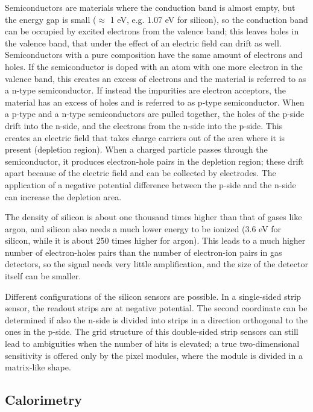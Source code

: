 Semiconductors are materials where the conduction band is almost empty, but the energy gap is small ($\approx$ 1 eV, e.g. 1.07 eV for silicon), so the conduction band can be occupied by excited electrons from the valence band; this leaves holes in the valence band, that under the effect of an electric field can drift as well. Semiconductors with a pure composition have the same amount of electrons and holes. If the semiconductor is doped with an atom with one more electron in the valence band, this creates an excess of electrons and the material is referred to as a n-type semiconductor. If instead the impurities are electron acceptors, the material has an excess of holes and is referred to as p-type semiconductor. When a p-type and a n-type semiconductors are pulled together, the holes of the p-side drift into the n-side, and the electrons from the n-side into the p-side. This creates an electric field that takes charge carriers out of the area where it is present (depletion region). When a charged particle passes through the semiconductor, it produces electron-hole pairs in the depletion region; these drift apart because of the electric field and can be collected by electrodes. The application of a negative potential difference between the p-side and the n-side can increase the depletion area.

The density of silicon is about one thousand times higher than that of gases like argon, and silicon also needs a much lower energy to be ionized (3.6 eV for silicon, while it is about 250 times higher for argon). This leads to a much higher number of electron-holes pairs than the number of electron-ion pairs in gas detectors, so the signal needs very little amplification, and the size of the detector itself can be smaller. 

Different configurations of the silicon sensors are possible. In a single-sided strip sensor, the readout strips are at negative potential. The second coordinate can be determined if also the n-side is divided into strips in a direction orthogonal to the ones in the p-side. 
The grid structure of this double-sided strip sensors can still lead to ambiguities when the number of hits is elevated; a true two-dimensional sensitivity is offered only by the pixel modules, where the module is divided in a matrix-like shape.



\subsection{Calorimetry}
\label{sec:dec:calo}

